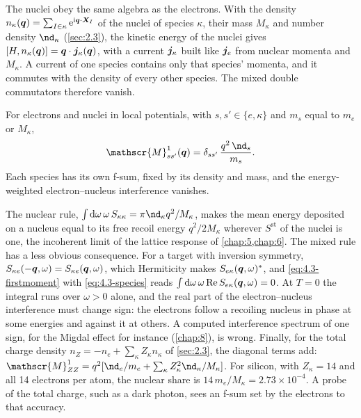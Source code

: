 The nuclei obey the same algebra as the electrons. With the density $n_\kappa(\bm{q}) = \sum_{I\in\kappa}\mathrm{e}^{\mathrm{i}\bm{q}\cdot\bm{X}_I}$ of the nuclei of species $\kappa$, their mass $M_\kappa$ and number density $\nd_\kappa$ (\cref{sec:2.3}), the kinetic energy of the nuclei gives $[H, n_\kappa(\bm{q})] = \bm{q}\cdot\bm{j}_\kappa(\bm{q})$, with a current $\bm{j}_\kappa$ built like $\bm{j}_e$ from nuclear momenta and $M_\kappa$. A current of one species contains only that species' momenta, and it commutes with the density of every other species. The mixed double commutators therefore vanish.
\begin{keyresult}
For electrons and nuclei in local potentials, with $s, s' \in \{e, \kappa\}$ and $m_s$ equal to $m_e$ or $M_\kappa$,
\begin{equation}
  \mathscr{M}^1_{ss'}(\vect{q}) = \delta_{ss'}\,\frac{q^2\,\nd_s}{m_s} .
  \label{eq:4.3-species}
\end{equation}
Each species has its own f-sum, fixed by its density and mass, and the energy-weighted electron--nucleus interference vanishes.
\end{keyresult}
The nuclear rule, $\int\dd\omega\,\omega\,S_{\kappa\kappa} = \pi\nd_\kappa q^2/M_\kappa$, makes the mean energy deposited on a nucleus equal to its free recoil energy $q^2/2M_\kappa$ wherever $S^{\mathrm{st}}$ of the nuclei is one, the incoherent limit of the lattice response of \cref{chap:5,chap:6}. The mixed rule has a less obvious consequence. For a target with inversion symmetry, $S_{\kappa e}(-\bm{q},\omega) = S_{\kappa e}(\bm{q},\omega)$, which Hermiticity makes $S_{e\kappa}(\bm{q},\omega)^*$, and \cref{eq:4.3-firstmoment} with \cref{eq:4.3-species} reads $\int\mathrm{d}\omega\,\omega\operatorname{Re} S_{e\kappa}(\bm{q},\omega) = 0$. At $T = 0$ the integral runs over $\omega > 0$ alone, and the real part of the electron--nucleus interference must change sign: the electrons follow a recoiling nucleus in phase at some energies and against it at others. A computed interference spectrum of one sign, for the Migdal effect for instance (\cref{chap:8}), is wrong. Finally, for the total charge density $n_Z = -n_e + \sum_\kappa Z_\kappa n_\kappa$ of \cref{sec:2.3}, the diagonal terms add: $\mathscr{M}^1_{ZZ} = q^2[\nd_e/m_e + \sum_\kappa Z_\kappa^2\nd_\kappa/M_\kappa]$. For silicon, with $Z_\kappa = 14$ and all 14 electrons per atom, the nuclear share is $14\,m_e/M_\kappa = 2.73\times10^{-4}$. A probe of the total charge, such as a dark photon, sees an f-sum set by the electrons to that accuracy.

